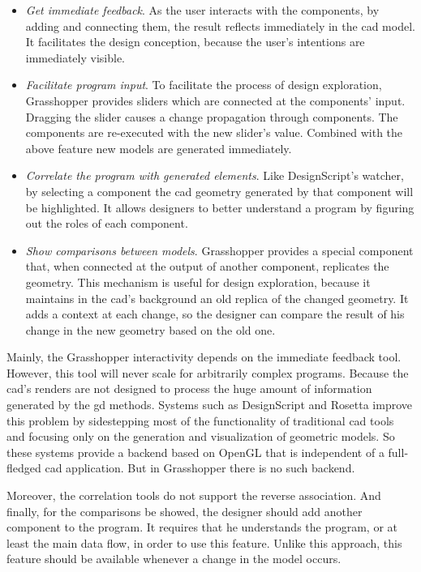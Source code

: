 \begin{itemize}
 \item \textit{Get immediate feedback}. As the user interacts with the components, by adding and connecting them, the result reflects immediately in the \ac{cad} model. It facilitates the design conception, because the user's intentions are immediately visible. 
 \item \textit{Facilitate program input}. To facilitate the process of design exploration, Grasshopper provides sliders which are connected at the components' input. Dragging the slider causes a change propagation through components. The components are re-executed with the new slider's value. Combined with the above feature new models are generated immediately.
 \item \textit{Correlate the program with generated elements}. Like DesignScript's watcher, by selecting a component the \ac{cad} geometry generated by that component will be highlighted. It allows designers to better understand a program by figuring out the roles of each component.
 \item \textit{Show comparisons between models}. Grasshopper provides a special component that, when connected at the output of another component, replicates the geometry. This mechanism is useful for design exploration, because it maintains in the \ac{cad}'s background an old replica of the changed geometry. It adds a context at each change, so the designer can compare the result of his change in the new geometry based on the old one.
\end{itemize}

Mainly, the Grasshopper interactivity depends on the immediate feedback tool. However, this tool will never scale for arbitrarily complex programs. Because the \ac{cad}'s renders are not designed to process the huge amount of information generated by the \ac{gd} methods. Systems such as DesignScript and Rosetta improve this problem by sidestepping most of the functionality of traditional \ac{cad} tools and focusing only on the generation and visualization of geometric models. So these systems provide a backend based on OpenGL that is independent of a full-fledged \ac{cad} application. But in Grasshopper there is no such backend.

Moreover, the correlation tools do not support the reverse association. And finally, for the comparisons be showed, the designer should add another component to the program. It requires that he understands the program, or at least the main data flow, in order to use this feature. Unlike this approach, this feature should be available whenever a change in the model occurs.
